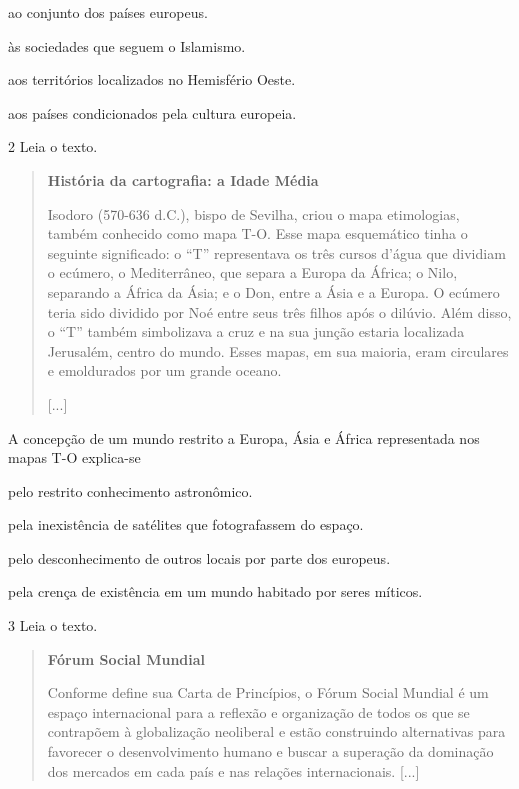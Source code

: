 \begin{escolha}
\item
  ao conjunto dos países europeus.
\item
  às sociedades que seguem o Islamismo.
\item
  aos territórios localizados no Hemisfério Oeste.
\item
  aos países condicionados pela cultura europeia.
\end{escolha}


\num{2} Leia o texto.

\begin{quote}
\textbf{História da cartografia: a Idade Média}

Isodoro (570-636 d.C.), bispo de Sevilha, criou o mapa
etimologias, também conhecido como mapa T-O. Esse mapa esquemático tinha
o seguinte significado: o ``T'' representava os três cursos d'água que
dividiam o ecúmero, o Mediterrâneo, que separa a Europa da África; o
Nilo, separando a África da Ásia; e o Don, entre a Ásia e a Europa. O
ecúmero teria sido dividido por Noé entre seus três filhos após o
dilúvio. Além disso, o ``T'' também simbolizava a cruz e na sua junção
estaria localizada Jerusalém, centro do mundo. Esses mapas, em sua
maioria, eram circulares e emoldurados por um grande oceano.

{[}...{]}

\end{quote}

A concepção de um mundo restrito a Europa, Ásia e África representada
nos mapas T-O explica-se

\begin{escolha}
\item
  pelo restrito conhecimento astronômico.
\item
  pela inexistência de satélites que fotografassem do espaço.
\item
  pelo desconhecimento de outros locais por parte dos europeus.
\item
  pela crença de existência em um mundo habitado por seres míticos.
\end{escolha}

\num{3} Leia o texto.

\begin{quote}
\textbf{Fórum Social Mundial}

Conforme define sua Carta de Princípios, o Fórum Social Mundial
é um espaço internacional para a reflexão e organização de todos os que
se contrapõem à globalização neoliberal e estão construindo alternativas
para favorecer o desenvolvimento humano e buscar a superação da
dominação dos mercados em cada país e nas relações internacionais.
{[}...{]}

\end{quote}

